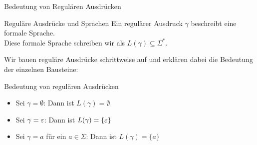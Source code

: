 \begin{frame}{Bedeutung von Regulären Ausdrücken}
    \begin{block}{Reguläre Ausdrücke und Sprachen}
        Ein regulärer Ausdruck $\gamma$ beschreibt eine formale Sprache.\\
        Diese formale Sprache schreiben wir als $L(\gamma) \subseteq \Sigma^*$.
    \end{block}
    Wir bauen reguläre Ausdrücke schrittweise auf und erklären dabei die Bedeutung der einzelnen Bausteine:
    \begin{block}{Bedeutung von regulären Ausdrücken}
        \begin{itemize}[<+- | alert@+>]
            \item Sei $\gamma = \emptyset$: Dann ist $L(\gamma) = \emptyset$
            \item Sei $\gamma = \varepsilon$: Dann ist $L(\gamma) = \{\varepsilon\}$
            \item Sei $\gamma = a$ für ein $a \in \Sigma$: Dann ist $L(\gamma) = \{a\}$
        \end{itemize}
    \end{block}
\end{frame}

